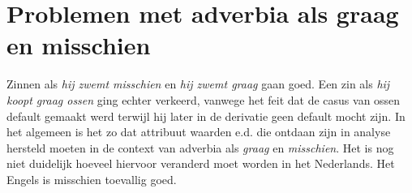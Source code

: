 \section{Problemen met adverbia als graag en misschien}
Zinnen als {\em hij zwemt misschien} en {\em hij zwemt graag} gaan goed. Een
zin als {\em hij koopt graag ossen} ging echter verkeerd, vanwege het feit dat
de casus van ossen default gemaakt werd terwijl hij later in de derivatie geen
default mocht zijn. In het algemeen is het zo dat attribuut waarden e.d. die
ontdaan zijn in analyse hersteld moeten in de context van adverbia als {\em
graag} en {\em misschien}. Het is nog niet duidelijk hoeveel hiervoor veranderd
moet worden in het Nederlands. Het Engels is misschien toevallig goed. 




